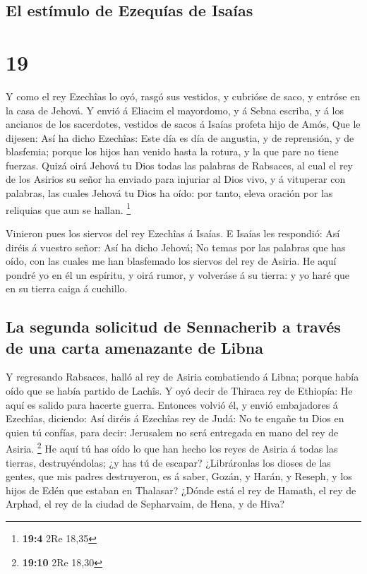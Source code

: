\hypertarget{el-estuxedmulo-de-ezequuxedas-de-isauxedas}{%
\subsection{El estímulo de Ezequías de
Isaías}\label{el-estuxedmulo-de-ezequuxedas-de-isauxedas}}

\hypertarget{section-18}{%
\section{19}\label{section-18}}

 Y como el rey Ezechîas lo oyó, rasgó sus vestidos, y
cubrióse de saco, y entróse en la casa de Jehová.  Y envió
á Eliacim el mayordomo, y á Sebna escriba, y á los ancianos de los
sacerdotes, vestidos de sacos á Isaías profeta hijo de Amós,
 Que le dijesen: Así ha dicho Ezechîas: Este día es día de
angustia, y de reprensión, y de blasfemia; porque los hijos han venido
hasta la rotura, y la que pare no tiene fuerzas.  Quizá
oirá Jehová tu Dios todas las palabras de Rabsaces, al cual el rey de
los Asirios su señor ha enviado para injuriar al Dios vivo, y á
vituperar con palabras, las cuales Jehová tu Dios ha oído: por tanto,
eleva oración por las reliquias que aun se hallan. \footnote{\textbf{19:4}
  2Re 18,35}

 Vinieron pues los siervos del rey Ezechîas á Isaías.
 E Isaías les respondió: Así diréis á vuestro señor: Así
ha dicho Jehová; No temas por las palabras que has oído, con las cuales
me han blasfemado los siervos del rey de Asiria.  He aquí
pondré yo en él un espíritu, y oirá rumor, y volveráse á su tierra: y yo
haré que en su tierra caiga á cuchillo.

\hypertarget{la-segunda-solicitud-de-sennacherib-a-travuxe9s-de-una-carta-amenazante-de-libna}{%
\subsection{La segunda solicitud de Sennacherib a través de una carta
amenazante de
Libna}\label{la-segunda-solicitud-de-sennacherib-a-travuxe9s-de-una-carta-amenazante-de-libna}}

 Y regresando Rabsaces, halló al rey de Asiria combatiendo
á Libna; porque había oído que se había partido de Lachîs.
 Y oyó decir de Thiraca rey de Ethiopía: He aquí es salido
para hacerte guerra. Entonces volvió él, y envió embajadores á Ezechîas,
diciendo:  Así diréis á Ezechîas rey de Judá: No te
engañe tu Dios en quien tú confías, para decir: Jerusalem no será
entregada en mano del rey de Asiria. \footnote{\textbf{19:10} 2Re 18,30}
 He aquí tú has oído lo que han hecho los reyes de Asiria
á todas las tierras, destruyéndolas; ¿y has tú de escapar?
 ¿Libráronlas los dioses de las gentes, que mis padres
destruyeron, es á saber, Gozán, y Harán, y Reseph, y los hijos de Edén
que estaban en Thalasar?  ¿Dónde está el rey de Hamath,
el rey de Arphad, el rey de la ciudad de Sepharvaim, de Hena, y de Hiva?


